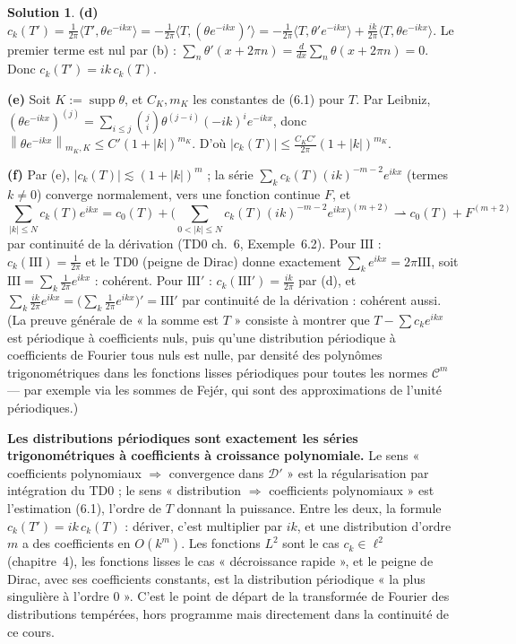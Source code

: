 \documentclass[11pt,a4paper]{article}
\newcommand{\norm}[1]{\left\|#1\right\|}
\newcommand{\wk}{\rightharpoonup}
\DeclareMathOperator{\supp}{supp}
\newcommand{\D}{\mathcal{D}}
\newcommand{\Sha}{\mathrm{III}}
\theoremstyle{definition}
\newtheorem*{solution}{Solution}
\begin{document}
\begin{solution}
\medskip
\noindent\textbf{(d)} $c_k(T')=\frac1{2\pi}\langle T',\theta e^{-ikx}\rangle=-\frac1{2\pi}\langle T,(\theta e^{-ikx})'\rangle=-\frac1{2\pi}\langle T,\theta'e^{-ikx}\rangle+\frac{ik}{2\pi}\langle T,\theta e^{-ikx}\rangle$. Le premier terme est nul par (b) : $\sum_n\theta'(x+2\pi n)=\frac d{dx}\sum_n\theta(x+2\pi n)=0$. Donc $c_k(T')=ik\,c_k(T)$.

\medskip
\noindent\textbf{(e)} Soit $K:=\supp\theta$, et $C_K,m_K$ les constantes de (6.1) pour $T$. Par Leibniz, $(\theta e^{-ikx})^{(j)}=\sum_{i\le j}\binom ji\theta^{(j-i)}(-ik)^ie^{-ikx}$, donc $\norm{\theta e^{-ikx}}_{m_K,K}\le C'(1+|k|)^{m_K}$. D'où $|c_k(T)|\le\frac{C_KC'}{2\pi}(1+|k|)^{m_K}$.

\medskip
\noindent\textbf{(f)} Par (e), $|c_k(T)|\lesssim(1+|k|)^m$ ; la série $\sum_kc_k(T)(ik)^{-m-2}e^{ikx}$ (termes $k\ne0$) converge normalement, vers une fonction continue $F$, et
\[
\sum_{|k|\le N}c_k(T)e^{ikx}=c_0(T)+\Big(\sum_{0<|k|\le N}c_k(T)(ik)^{-m-2}e^{ikx}\Big)^{(m+2)}\wk c_0(T)+F^{(m+2)}
\]
par continuité de la dérivation (TD0 ch.~6, Exemple~6.2). Pour $\Sha$ : $c_k(\Sha)=\frac1{2\pi}$ et le TD0 (peigne de Dirac) donne exactement $\sum_ke^{ikx}=2\pi\Sha$, soit $\Sha=\sum_k\frac1{2\pi}e^{ikx}$ : cohérent. Pour $\Sha'$ : $c_k(\Sha')=\frac{ik}{2\pi}$ par (d), et $\sum_k\frac{ik}{2\pi}e^{ikx}=\big(\sum_k\frac1{2\pi}e^{ikx}\big)'=\Sha'$ par continuité de la dérivation : cohérent aussi. (La preuve générale de « la somme est $T$ » consiste à montrer que $T-\sum c_ke^{ikx}$ est périodique à coefficients nuls, puis qu'une distribution périodique à coefficients de Fourier tous nuls est nulle, par densité des polynômes trigonométriques dans les fonctions lisses périodiques pour toutes les normes $\mathcal C^m$ — par exemple via les sommes de Fejér, qui sont des approximations de l'unité périodiques.)
\end{solution}

\begin{pointcle}
\textbf{Les distributions périodiques sont exactement les séries trigonométriques à coefficients à croissance polynomiale.} Le sens « coefficients polynomiaux $\Rightarrow$ convergence dans $\D'$ » est la régularisation par intégration du TD0 ; le sens « distribution $\Rightarrow$ coefficients polynomiaux » est l'estimation (6.1), l'ordre de $T$ donnant la puissance. Entre les deux, la formule $c_k(T')=ik\,c_k(T)$ : dériver, c'est multiplier par $ik$, et une distribution d'ordre $m$ a des coefficients en $O(k^m)$. Les fonctions $L^2$ sont le cas $c_k\in\ell^2$ (chapitre~4), les fonctions lisses le cas « décroissance rapide », et le peigne de Dirac, avec ses coefficients constants, est la distribution périodique « la plus singulière à l'ordre $0$ ». C'est le point de départ de la transformée de Fourier des distributions tempérées, hors programme mais directement dans la continuité de ce cours.
\end{pointcle}
\end{document}
